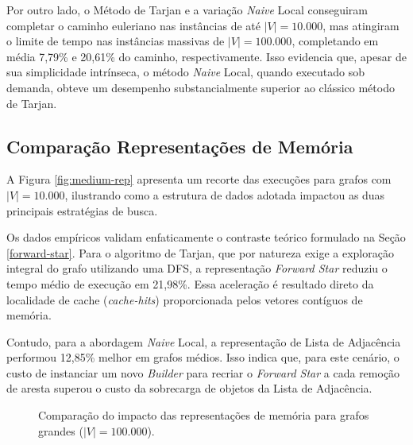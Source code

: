 \documentclass[12pt]{article}
\begin{document}
Por outro lado, o Método de Tarjan e a variação \textit{Naive} Local conseguiram completar o caminho euleriano nas instâncias de até $|V| = 10.000$, mas atingiram o limite de tempo nas instâncias massivas de $|V| = 100.000$, completando em média 7,79\% e 20,61\% do caminho, respectivamente. Isso evidencia que, apesar de sua simplicidade intrínseca, o método \textit{Naive} Local, quando executado sob demanda, obteve um desempenho substancialmente superior ao clássico método de Tarjan.

\subsection{Comparação Representações de Memória}

A Figura \ref{fig:medium-rep} apresenta um recorte das execuções para grafos com $|V| = 10.000$, ilustrando como a estrutura de dados adotada impactou as duas principais estratégias de busca.

Os dados empíricos validam enfaticamente o contraste teórico formulado na Seção \ref{forward-star}. Para o algoritmo de Tarjan, que por natureza exige a exploração integral do grafo utilizando uma DFS, a representação \textit{Forward Star} reduziu o tempo médio de execução em 21,98\%. Essa aceleração é resultado direto da localidade de cache (\textit{cache-hits}) proporcionada pelos vetores contíguos de memória.

Contudo, para a abordagem \textit{Naive} Local, a representação de Lista de Adjacência performou 12,85\% melhor em grafos médios. Isso indica que, para este cenário, o custo de instanciar um novo \textit{Builder} para recriar o \textit{Forward Star} a cada remoção de aresta superou o custo da sobrecarga de objetos da Lista de Adjacência.

\begin{figure}[htbp]
    \centering
    \caption{Comparação do impacto das representações de memória para grafos grandes ($|V| = 100.000$).}
    \label{fig:large-rep}
\end{figure}
\end{document}
